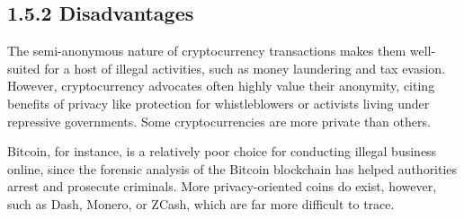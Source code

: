 	 \subsection*{1.5.2 Disadvantages} 
	 The semi-anonymous nature of cryptocurrency transactions makes them well-suited for a host of illegal activities, such as money laundering and tax evasion. However, cryptocurrency advocates often highly value their anonymity, citing benefits of privacy like protection for whistleblowers or activists living under repressive governments. Some cryptocurrencies are more private than others. 
	 
	 Bitcoin, for instance, is a relatively poor choice for conducting illegal business online, since the forensic analysis of the Bitcoin blockchain has helped authorities arrest and prosecute criminals. More privacy-oriented coins do exist, however, such as Dash, Monero, or ZCash, which are far more difficult to trace.
	